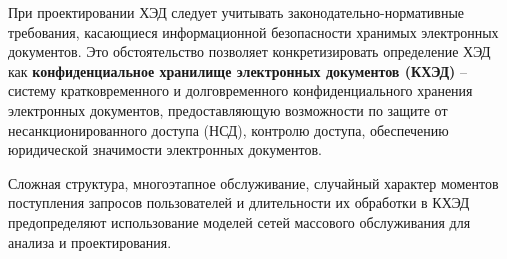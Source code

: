 \vspace{\baselineskip}
При проектировании ХЭД следует учитывать законодательно-нормативные требования, касающиеся информационной безопасности хранимых электронных документов. Это обстоятельство позволяет конкретизировать определение ХЭД как \textbf{конфиденциальное хранилище электронных документов (КХЭД)} – систему кратковременного и долговременного конфиденциального хранения электронных документов, предоставляющую возможности по защите от несанкционированного доступа (НСД), контролю доступа, обеспечению юридической значимости электронных документов. \cite{bib3}

\vspace{\baselineskip}
Сложная структура, многоэтапное обслуживание, случайный характер моментов поступления запросов пользователей и длительности их обработки в КХЭД предопределяют использование моделей сетей массового обслуживания для анализа и проектирования.